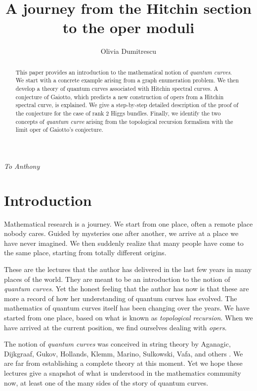 \documentclass[oneside, 11pt]{amsart}
\title{A journey from the Hitchin section to the oper moduli}
\author{Olivia Dumitrescu}
\theoremstyle{definition}
\numberwithin{equation}{subsection}
\begin{document}
\maketitle


\centerline{\emph{To Anthony}}

\begin{abstract} 
This paper provides an introduction to
the mathematical notion of \emph{quantum curves}. 
We start with a concrete example arising from a 
graph enumeration problem. We then 
develop a theory of quantum curves associated
with Hitchin spectral curves. A conjecture of
Gaiotto, which predicts a new construction of
opers from a Hitchin spectral curve,
is explained.
We give a
step-by-step detailed description of the proof
of the conjecture  for the case of
rank $2$ Higgs bundles. Finally, we identify the two concepts of \textit{quantum curve} arising from the topological recursion formalism with the limit oper of Gaiotto's conjecture.

\end{abstract}



\setlength\intextsep{0pt}


\tableofcontents




\section{Introduction}

Mathematical research is  a journey. We start from
one place, often a remote place nobody cares. 
Guided by  mysteries one after another, we 
arrive at a place we have never imagined. We then 
suddenly realize that many people have come to
the same place, starting from totally different
origins. 

These are the lectures that the author has 
delivered in the last few years in many places of 
the world. They are meant to be an introduction to 
the notion of \emph{quantum curves}. Yet the
honest feeling that the author has now is that
these are more a record of how her 
understanding of  quantum curves has evolved.
The mathematics of quantum curves itself has been 
changing over the years. We have started from one 
place, based on what is known as 
\emph{topological recursion}. When we have 
arrived at the current position, we find 
ourselves  dealing with
\emph{opers}. 

The notion of \textit{quantum curves} was conceived in string theory by Aganagic, Dijkgraaf, Gukov, Hollands, Klemm, Marino, Sulkowski, Vafa, and others \cite{ADKMV,DHS,DHSV,GS}. We are far from 
establishing a complete theory at this moment. 
Yet we hope these lectures give a snapshot of
what is understood in the mathematics community
now, at least one 
of the many sides of the story of quantum curves.
\end{document}
